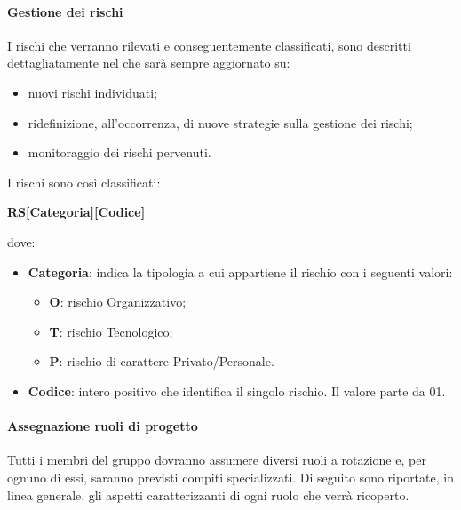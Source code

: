 		\paragraph{Gestione dei rischi}
		I rischi che verranno rilevati e conseguentemente classificati, sono descritti dettagliatamente nel  che sarà sempre aggiornato su:
		\begin{itemize}
			\item nuovi rischi individuati;
			\item ridefinizione, all'occorrenza, di nuove strategie sulla gestione dei rischi;
			\item monitoraggio dei rischi pervenuti.
		\end{itemize}
		\noindent
		I rischi sono così classificati:
		\begin{center}
			{\bfseries RS[Categoria][Codice]}
		\end{center}
		dove:
		\begin{itemize}
			\item \textbf{Categoria}: indica la tipologia a cui appartiene il rischio con i seguenti valori:
			\begin{itemize}
				\item {\bfseries O}: rischio Organizzativo;
				\item {\bfseries T}: rischio Tecnologico;
				\item {\bfseries P}: rischio di carattere Privato/Personale. \\
			\end{itemize}
			\item \textbf{Codice}: intero positivo che identifica il singolo rischio. Il valore parte da 01.
		\end{itemize}

    	\paragraph{Assegnazione ruoli di progetto}
    	Tutti i membri del gruppo dovranno assumere diversi ruoli a rotazione e, per ognuno di essi, saranno previsti compiti specializzati. Di seguito sono riportate, in linea generale, gli aspetti caratterizzanti di ogni ruolo che verrà ricoperto.


